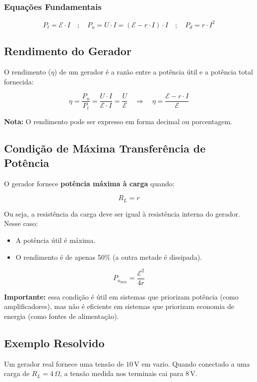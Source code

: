 \subsubsection{Equações Fundamentais}

\[
P_t = \mathcal{E} \cdot I
\quad ; \quad
P_u = U \cdot I = (\mathcal{E} - r \cdot I) \cdot I
\quad ; \quad
P_d = r \cdot I^2
\]

\subsection{Rendimento do Gerador}
O rendimento ($\eta$) de um gerador é a razão entre a potência útil e a potência total fornecida:

\[
\eta = \frac{P_u}{P_t} = \frac{U \cdot I}{\mathcal{E} \cdot I} = \frac{U}{\mathcal{E}}
\quad \Rightarrow \quad
\eta = \frac{\mathcal{E} - r \cdot I}{\mathcal{E}}
\]

\textbf{Nota:} O rendimento pode ser expresso em forma decimal ou porcentagem.

\subsection{Condição de Máxima Transferência de Potência}
O gerador fornece \textbf{potência máxima à carga} quando:

\[
R_L = r
\]

Ou seja, a resistência da carga deve ser igual à resistência interna do gerador. Nesse caso:

\begin{itemize}
    \item A potência útil é máxima.
    \item O rendimento é de apenas 50\% (a outra metade é dissipada).
\end{itemize}

\[
P_{u_{\text{máx}}} = \frac{\mathcal{E}^2}{4r}
\]

\textbf{Importante:} essa condição é útil em sistemas que priorizam potência (como amplificadores), mas não é eficiente em sistemas que priorizam economia de energia (como fontes de alimentação).

\subsection{Exemplo Resolvido}
Um gerador real fornece uma tensão de $10\,\text{V}$ em vazio. Quando conectado a uma carga de $R_L = 4\,\Omega$, a tensão medida nos terminais cai para $8\,\text{V}$.

